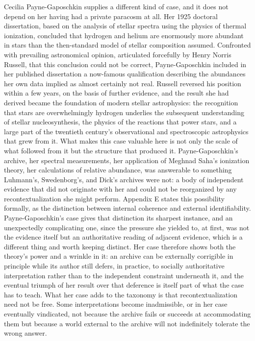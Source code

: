 \documentclass[11pt]{article}
\begin{document}
Cecilia Payne-Gaposchkin supplies a different kind of case, and it does not depend on her having had a private paracosm at all. Her 1925 doctoral dissertation, based on the analysis of stellar spectra using the physics of thermal ionization, concluded that hydrogen and helium are enormously more abundant in stars than the then-standard model of stellar composition assumed. Confronted with prevailing astronomical opinion, articulated forcefully by Henry Norris Russell, that this conclusion could not be correct, Payne-Gaposchkin included in her published dissertation a now-famous qualification describing the abundances her own data implied as almost certainly not real. Russell reversed his position within a few years, on the basis of further evidence, and the result she had derived became the foundation of modern stellar astrophysics: the recognition that stars are overwhelmingly hydrogen underlies the subsequent understanding of stellar nucleosynthesis, the physics of the reactions that power stars, and a large part of the twentieth century's observational and spectroscopic astrophysics that grew from it. What makes this case valuable here is not only the scale of what followed from it but the structure that produced it. Payne-Gaposchkin's archive, her spectral measurements, her application of Meghnad Saha's ionization theory, her calculations of relative abundance, was answerable to something Luhmann's, Swedenborg's, and Dick's archives were not: a body of independent evidence that did not originate with her and could not be reorganized by any recontextualization she might perform. Appendix E states this possibility formally, as the distinction between internal coherence and external identifiability. Payne-Gaposchkin's case gives that distinction its sharpest instance, and an unexpectedly complicating one, since the pressure she yielded to, at first, was not the evidence itself but an authoritative reading of adjacent evidence, which is a different thing and worth keeping distinct. Her case therefore shows both the theory's power and a wrinkle in it: an archive can be externally corrigible in principle while its author still defers, in practice, to socially authoritative interpretation rather than to the independent constraint underneath it, and the eventual triumph of her result over that deference is itself part of what the case has to teach. What her case adds to the taxonomy is that recontextualization need not be free. Some interpretations become inadmissible, or in her case eventually vindicated, not because the archive fails or succeeds at accommodating them but because a world external to the archive will not indefinitely tolerate the wrong answer.
\end{document}
